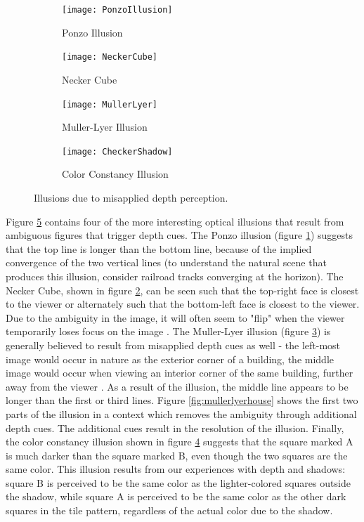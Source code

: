 \documentclass[11pt]{isuthesis}\usepackage[]{graphicx}\usepackage[]{color}
\begin{document}
\begin{figure}[htbp]\centering
\hfil
\begin{subfigure}[b]{.35\linewidth}\centering
  \texttt{[image: PonzoIllusion]}
  \caption{Ponzo Illusion}\label{fig:Ponzo}
\end{subfigure}\hfill
\begin{subfigure}[b]{.35\linewidth}\centering
  \texttt{[image: NeckerCube]}
  \caption{Necker Cube}\label{fig:NeckerCube}
\end{subfigure}\hfil

\hfil
\begin{subfigure}[b]{.35\linewidth}\centering
  \texttt{[image: MullerLyer]}
  \caption{Muller-Lyer Illusion}\label{fig:MullerLyer}
\end{subfigure}\hfill
\begin{subfigure}[b]{.35\linewidth}\centering
  \texttt{[image: CheckerShadow]}
  \caption{Color Constancy Illusion}\label{fig:ColorConstancy}
\end{subfigure}\hfil

\caption[Depth Illusions]{Illusions due to misapplied depth perception.}\label{fig:DepthIllusions}
\end{figure}
Figure \ref{fig:DepthIllusions} contains four of the more interesting optical illusions that result from ambiguous figures that trigger depth cues. The Ponzo illusion (figure \ref{fig:Ponzo}) suggests that the top line is longer than the bottom line, because of the implied convergence of the two vertical lines (to understand the natural scene that produces this illusion, consider railroad tracks converging at the horizon). The Necker Cube, shown in figure \ref{fig:NeckerCube}, can be seen such that the top-right face is closest to the viewer or alternately such that the bottom-left face is closest to the viewer. Due to the ambiguity in the image, it will often seem to "flip" when the viewer temporarily loses focus on the image \citep{gregory1997knowledge}. The Muller-Lyer illusion (figure \ref{fig:MullerLyer}) is generally believed to result from misapplied depth cues as well - the left-most image would occur in nature as the exterior corner of a building, the middle image would occur when viewing an interior corner of the same building, further away from the viewer \citep{ward1977case, gregory1968perceptual, fisher1970experimental}. As a result of the illusion, the middle line appears to be longer than the first or third lines. Figure \ref{fig:mullerlyerhouse} shows the first two parts of the illusion in a context which removes the ambiguity through additional depth cues. The additional cues result in the resolution of the illusion. Finally, the color constancy illusion shown in figure \ref{fig:ColorConstancy} suggests that the square marked A is much darker than the square marked B, even though the two squares are the same color. This illusion results from our experiences with depth and shadows: square B is perceived to be the same color as the lighter-colored squares outside the shadow, while square A is perceived to be the same color as the other dark squares in the tile pattern, regardless of the actual color due to the shadow. 
\end{document}
